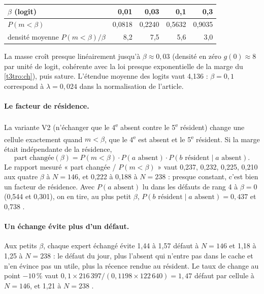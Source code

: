 \begin{center}\small
\begin{tabular}{@{}lrrrr@{}}
\toprule
$\beta$ (logit) & 0,01 & 0,03 & 0,1 & 0,3 \\
\midrule
$P(m < \beta)$ & 0,0818 & 0,2240 & 0,5632 & 0,9035 \\
densité moyenne $P(m<\beta)/\beta$ & 8,2 & 7,5 & 5,6 & 3,0 \\
\bottomrule
\end{tabular}
\end{center}
La masse croît presque linéairement jusqu'à $\beta \approx 0{,}03$ (densité en zéro $g(0) \approx 8$ par unité de logit, cohérente avec la loi presque exponentielle de la marge du \cref{t3tro:ch}), puis sature. L'étendue moyenne des logits vaut 4,136 : $\beta = 0{,}1$ correspond à $\lambda = 0{,}024$ dans la normalisation de l'article.

\paragraph{Le facteur de résidence.} La variante V2 (n'échanger que le 4\textsuperscript{e} absent contre le 5\textsuperscript{e} résident) change une cellule exactement quand $m < \beta$, que le 4\textsuperscript{e} est absent et le 5\textsuperscript{e} résident. Si la marge était indépendante de la résidence,
\begin{equation}\label{t3mim:eq:p3-part}
\text{part changée}(\beta) = P(m < \beta)\cdot P(a \text{ absent}) \cdot P(b \text{ résident} \mid a \text{ absent}).
\end{equation}
Le rapport mesuré « part changée / $P(m<\beta)$ » vaut 0,237, 0,232, 0,225, 0,210 aux quatre $\beta$ à $N = 146$, et 0,222 à 0,188 à $N = 238$ \mes : presque constant, c'est bien un facteur de résidence. Avec $P(a \text{ absent})$ lu dans les défauts de rang 4 à $\beta = 0$ (0,544 et 0,301), on en tire, au plus petit $\beta$, $P(b \text{ résident} \mid a \text{ absent}) = 0{,}437$ et 0,738 \calc.

\paragraph{Un échange évite plus d'un défaut.} Aux petits $\beta$, chaque expert échangé évite 1,44 à 1,57 défaut à $N = 146$ et 1,18 à 1,25 à $N = 238$ \mes : le défaut du jour, plus l'absent qui n'entre pas dans le cache et n'en évince pas un utile, plus la récence rendue au résident. Le taux de change au point $-10\,\%$ vaut $0{,}1 \times 216\,397 / (0{,}1198 \times 122\,640) = 1{,}47$ défaut par cellule à $N = 146$, et 1,21 à $N = 238$ \calc.

